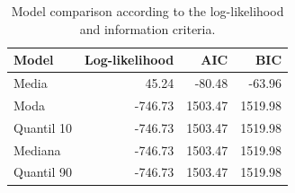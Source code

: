 \begin{table}[ht]
\centering
\caption{Model comparison according to the log-likelihood and information criteria.}
\label{tab:model_comparison}
\begin{tabular}{lrrr}
\toprule
Model & Log-likelihood & AIC & BIC\\
\midrule
Media & 45.24 & -80.48 & -63.96\\
Moda & -746.73 & 1503.47 & 1519.98\\
Quantil 10 & -746.73 & 1503.47 & 1519.98\\
Mediana & -746.73 & 1503.47 & 1519.98\\
Quantil 90 & -746.73 & 1503.47 & 1519.98\\
\bottomrule
\end{tabular}
\end{table}
